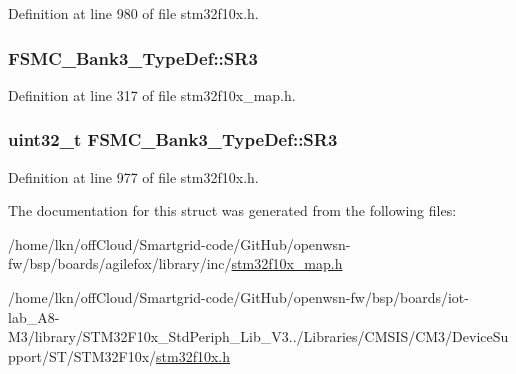 Definition at line 980 of file stm32f10x.\+h.

\subsubsection[{\texorpdfstring{S\+R3}{SR3}}]{ F\+S\+M\+C\+\_\+\+Bank3\+\_\+\+Type\+Def\+::\+S\+R3}\hypertarget{struct_f_s_m_c___bank3___type_def_aacc20066ecea1b8bdbb6fb6959e630ed}{}\label{struct_f_s_m_c___bank3___type_def_aacc20066ecea1b8bdbb6fb6959e630ed}


Definition at line 317 of file stm32f10x\+\_\+map.\+h.

\subsubsection[{\texorpdfstring{S\+R3}{SR3}}]{ {\bf uint32\+\_\+t} F\+S\+M\+C\+\_\+\+Bank3\+\_\+\+Type\+Def\+::\+S\+R3}\hypertarget{struct_f_s_m_c___bank3___type_def_ab89f16f64018a1f1e55d36f92b84be94}{}\label{struct_f_s_m_c___bank3___type_def_ab89f16f64018a1f1e55d36f92b84be94}


Definition at line 977 of file stm32f10x.\+h.



The documentation for this struct was generated from the following files\+:\begin{DoxyCompactItemize}
\item 
/home/lkn/off\+Cloud/\+Smartgrid-\/code/\+Git\+Hub/openwsn-\/fw/bsp/boards/agilefox/library/inc/\hyperlink{agilefox_2library_2inc_2stm32f10x__map_8h}{stm32f10x\+\_\+map.\+h}\item 
/home/lkn/off\+Cloud/\+Smartgrid-\/code/\+Git\+Hub/openwsn-\/fw/bsp/boards/iot-\/lab\+\_\+\+A8-\/\+M3/library/\+S\+T\+M32\+F10x\+\_\+\+Std\+Periph\+\_\+\+Lib\+\_\+\+V3../\+Libraries/\+C\+M\+S\+I\+S/\+C\+M3/\+Device\+Support/\+S\+T/\+S\+T\+M32\+F10x/\hyperlink{iot-lab___a8-_m3_2library_2_s_t_m32_f10x___std_periph___lib___v3_85_80_2_libraries_2_c_m_s_i_s_26497265545392eb5694b064ae15018db}{stm32f10x.\+h}\end{DoxyCompactItemize}
